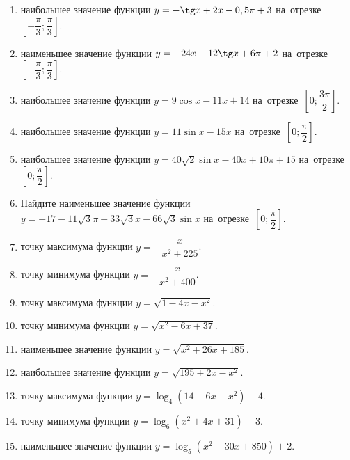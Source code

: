 \documentclass[a4paper,10pt]{article}
\begin{document}
\begin{enumerate}
\item {} наибольшее значение функции $y=-\tg x +2x-0,5\pi +3$ на~отрезке~$\left[-\dfrac{\pi}{3};\dfrac{\pi}{3}\right]$.

\item {} наименьшее значение функции $y=-24x +12\tg x+6\pi+2$ на~отрезке~$\left[-\dfrac{\pi}{3};\dfrac{\pi}{3}\right]$.

\item {} наибольшее значение функции $y=9\cos x-11x+14$ на~отрезке~$\left[0;\dfrac{3\pi}{2}\right]$.

\item {} наибольшее значение функции $y=11\sin x-15x$ на~отрезке~$\left[0;\dfrac{\pi}{2}\right]$.

\item {} наибольшее значение функции $y=40\sqrt{2}\sin x-40x+10\pi +15$ на~отрезке~$\left[0;\dfrac{\pi}{2}\right]$.

\item Найдите наименьшее значение функции $y=-17-11\sqrt{3}\pi+33\sqrt{3}x-66\sqrt{3}\sin x$ на~отрезке~$\left[0;\dfrac{\pi}{2}\right]$.

\item {} точку максимума функции $y=-\dfrac{x}{ x^2 +225}$.

\item {} точку минимума функции $y=-\dfrac{x}{ x^2 +400}$.

\item {} точку максимума функции $y=\sqrt{1-4x-x^2}$.

\item {} точку минимума функции $y=\sqrt{x^2-6x+37}$.

\item {} наименьшее значение функции $y=\sqrt{x^2+26x+185}$.

\item {} наибольшее значение функции $y=\sqrt{195+2x-x^2}$.

\item {} точку максимума функции $y=\log_4\left(14-6x-x^2\right)-4$.

\item {} точку минимума функции $y=\log_6\left(x^2+4x+31\right)-3$.

\item {} наименьшее значение функции $y=\log_5\left(x^2-30x+850\right)+2$.


\end{enumerate}
\end{document}
